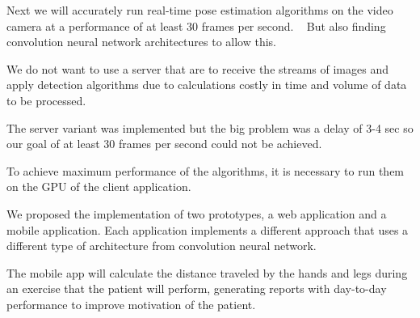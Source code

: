 Next we will accurately run real-time pose estimation algorithms on the video camera at a performance of at least 30 frames per second.
  But also finding convolution neural network architectures to allow this.

We do not want to use a server that are to receive the streams of images 
and apply detection algorithms due to calculations costly in time and volume of data to be processed.

The server variant was implemented but the big problem 
was a delay of 3-4 sec so our goal of at least 30 frames per second could not be achieved.


To achieve maximum performance of the algorithms, 
it is necessary to run them on the GPU of the client application. 

 We proposed the implementation of two prototypes, a web application and a mobile application.
Each application implements a different approach that uses a different type of architecture from convolution neural network.



The mobile app will calculate the distance traveled by the hands and legs during an exercise that the 
patient will perform, generating reports with day-to-day performance to improve motivation of the patient.



